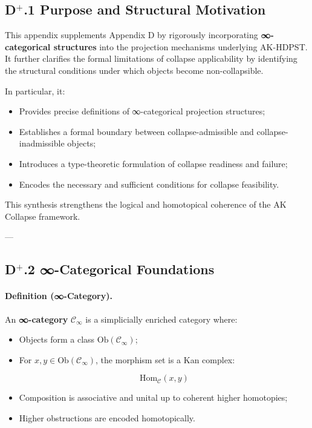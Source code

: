 \documentclass[11pt]{article}
\begin{document}
\subsection*{D$^{+}$.1 Purpose and Structural Motivation}

This appendix supplements Appendix D by rigorously incorporating \textbf{∞-categorical structures} into the projection mechanisms underlying AK-HDPST. It further clarifies the formal limitations of collapse applicability by identifying the structural conditions under which objects become non-collapsible.

In particular, it:

\begin{itemize}
    \item Provides precise definitions of ∞-categorical projection structures;
    \item Establishes a formal boundary between collapse-admissible and collapse-inadmissible objects;
    \item Introduces a type-theoretic formulation of collapse readiness and failure;
    \item Encodes the necessary and sufficient conditions for collapse feasibility.
\end{itemize}

This synthesis strengthens the logical and homotopical coherence of the AK Collapse framework.

---

\subsection*{D$^{+}$.2 ∞-Categorical Foundations}

\paragraph{Definition (∞-Category).}

An \textbf{∞-category} $\mathcal{C}_\infty$ is a simplicially enriched category where:

\begin{itemize}
    \item Objects form a class $\mathrm{Ob}(\mathcal{C}_\infty)$;
    \item For $x, y \in \mathrm{Ob}(\mathcal{C}_\infty)$, the morphism set is a Kan complex:
    
    \[
    \mathrm{Hom}_{\mathcal{C}}(x, y)
    \]
    
    \item Composition is associative and unital up to coherent higher homotopies;
    \item Higher obstructions are encoded homotopically.
\end{itemize}
\end{document}
